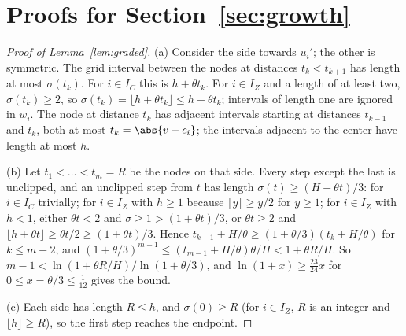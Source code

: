 \section{Proofs for Section~\ref{sec:growth}}\label{app:growth}

\begin{proof}[Proof of Lemma~\ref{lem:graded}]
(a) Consider the side towards $u_i'$; the other is symmetric. The grid interval
between the nodes at distances $t_k<t_{k+1}$ has length at most $\sigma(t_k)$.
For $i\in I_C$ this is $h+\theta t_k$. For $i\in I_Z$ and a length of at least
two, $\sigma(t_k)\ge2$, so $\sigma(t_k)=\lfloor h+\theta t_k\rfloor\le h+\theta t_k$;
intervals of length one are ignored in $w_i$. The node at distance $t_k$ has
adjacent intervals starting at distances $t_{k-1}$ and $t_k$, both at most
$t_k=\abs{v-c_i}$; the intervals adjacent to the center have length at most $h$.

(b) Let $t_1<\dots<t_m=R$ be the nodes on that side. Every step except the last
is unclipped, and an unclipped step from $t$ has length
$\sigma(t)\ge(H+\theta t)/3$: for $i\in I_C$ trivially; for $i\in I_Z$ with $h\ge1$
because $\lfloor y\rfloor\ge y/2$ for $y\ge1$; for $i\in I_Z$ with $h<1$, either
$\theta t<2$ and $\sigma\ge1>(1+\theta t)/3$, or $\theta t\ge2$ and
$\lfloor h+\theta t\rfloor\ge\theta t/2\ge(1+\theta t)/3$. Hence
$t_{k+1}+H/\theta\ge(1+\theta/3)(t_k+H/\theta)$ for $k\le m-2$, and
$(1+\theta/3)^{m-1}\le(t_{m-1}+H/\theta)\theta/H<1+\theta R/H$. So
$m-1<\ln(1+\theta R/H)/\ln(1+\theta/3)$, and
$\ln(1+x)\ge\frac{23}{24}x$ for $0\le x=\theta/3\le\frac1{12}$ gives the bound.

(c) Each side has length $R\le h$, and $\sigma(0)\ge R$ (for $i\in I_Z$, $R$ is
an integer and $\lfloor h\rfloor\ge R$), so the first step reaches the endpoint.
\end{proof}

